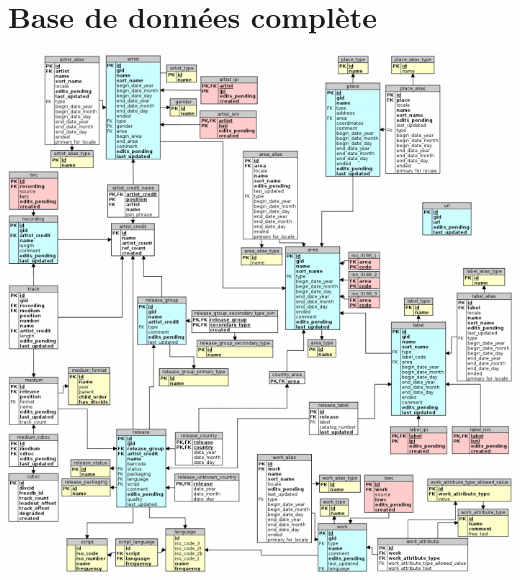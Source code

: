 \documentclass{report}
\begin{document}
\chapter{Base de données complète}
\thispagestyle{fancy}
		\begin{center}
			\includegraphics[scale=.5]{images/database.png}
		\end{center}
\end{document}
